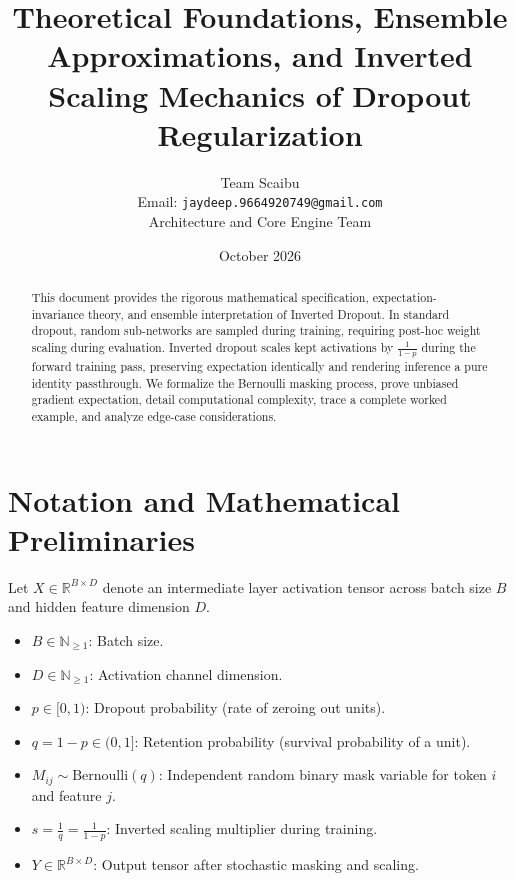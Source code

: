 \documentclass[11pt,a4paper]{article}
\title{\textbf{Theoretical Foundations, Ensemble Approximations, and Inverted Scaling Mechanics of Dropout Regularization}}
\author{Team Scaibu \\ \small Email: \texttt{jaydeep.9664920749@gmail.com} \\ \small Architecture and Core Engine Team}
\date{October 2026}
\theoremstyle{definition}
\begin{document}
\maketitle

\begin{abstract}
This document provides the rigorous mathematical specification, expectation-invariance theory, and ensemble interpretation of Inverted Dropout. In standard dropout, random sub-networks are sampled during training, requiring post-hoc weight scaling during evaluation. Inverted dropout scales kept activations by $\frac{1}{1-p}$ during the forward training pass, preserving expectation identically and rendering inference a pure identity passthrough. We formalize the Bernoulli masking process, prove unbiased gradient expectation, detail computational complexity, trace a complete worked example, and analyze edge-case considerations.
\end{abstract}

\section{Notation and Mathematical Preliminaries}

Let $X \in \mathbb{R}^{B \times D}$ denote an intermediate layer activation tensor across batch size $B$ and hidden feature dimension $D$.

\begin{itemize}
    \item $B \in \mathbb{N}_{\ge 1}$: Batch size.
    \item $D \in \mathbb{N}_{\ge 1}$: Activation channel dimension.
    \item $p \in [0, 1)$: Dropout probability (rate of zeroing out units).
    \item $q = 1 - p \in (0, 1]$: Retention probability (survival probability of a unit).
    \item $M_{ij} \sim \text{Bernoulli}(q)$: Independent random binary mask variable for token $i$ and feature $j$.
    \item $s = \frac{1}{q} = \frac{1}{1-p}$: Inverted scaling multiplier during training.
    \item $Y \in \mathbb{R}^{B \times D}$: Output tensor after stochastic masking and scaling.
\end{itemize}
\end{document}
